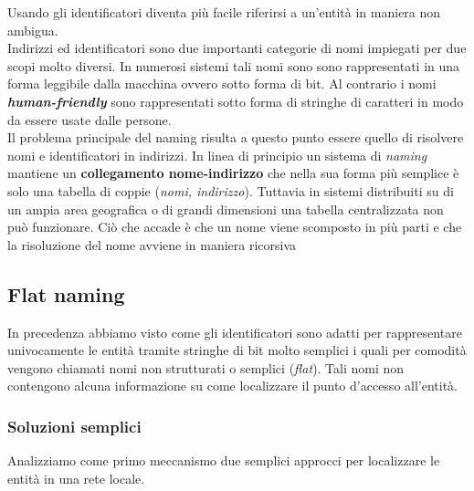Usando gli identificatori diventa più facile riferirsi a un'entità in maniera non ambigua.\\
Indirizzi ed identificatori sono due importanti categorie di nomi impiegati per due scopi molto diversi. In numerosi sistemi tali nomi sono sono rappresentati in una forma leggibile dalla macchina ovvero sotto forma di bit. Al contrario i nomi \emph{\textbf{human-friendly}} sono rappresentati sotto forma di stringhe di caratteri in modo da essere usate dalle persone.\\
Il problema principale del naming risulta a questo punto essere quello di risolvere nomi e identificatori in indirizzi. In linea di principio un sistema di \emph{naming} mantiene un \textbf{collegamento nome-indirizzo} che nella sua forma più semplice è solo una tabella di coppie (\emph{nomi, indirizzo}). Tuttavia in sistemi distribuiti su di un ampia area geografica o di grandi dimensioni una tabella centralizzata non può funzionare.
Ciò che accade è che un nome viene scomposto in più parti e che la risoluzione del nome avviene in maniera ricorsiva
\subsection{Flat naming}
In precedenza abbiamo visto come gli identificatori sono adatti per rappresentare univocamente le entità tramite stringhe di bit molto semplici i quali per comodità vengono chiamati nomi non strutturati o semplici (\emph{flat}). Tali nomi non contengono alcuna informazione su come localizzare il punto d'accesso all'entità.
\subsubsection{Soluzioni semplici}
Analizziamo come primo meccanismo due semplici approcci per localizzare le entità in una rete locale.
